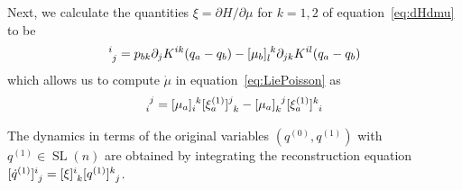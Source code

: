 \documentclass[12pt]{amsart}
\DeclareMathOperator{\SL}{SL}
\begin{document}
Next, we calculate the quantities $\xi = \partial H / \partial \mu$
for $k=1,2$ of equation~\eqref{eq:dHdmu} to be
\begin{equation*}
  [\xi_a ]\indices{^i_j} =
  p_{b k} \partial_j K^{i k}(q_a - q_b)
 -[\mu_b]\indices{_{l}^{k}} \partial_{j k} K^{i l}(q_a - q_b)
\end{equation*}
which allows us to compute $\dot{\mu}$ in equation~\eqref{eq:LiePoisson} as
\begin{equation*}
  [\dot{\mu}_a ]\indices{_i^j} =
  [\mu_a]\indices{_i^k} [\xi_a^{(1)}]\indices{^j_k}
 -[\mu_a]\indices{_k^j} [\xi_a^{(1)}]\indices{^k_i}
\end{equation*}

The dynamics in terms of the original variables $(q^{(0)},q^{(1)})$ with $q^{(1)} \in \SL(n)$ are obtained by integrating the reconstruction equation
$
  [\dot{q}^{(1)}]\indices{^i_j} =
  [\xi]\indices{^i_k} [q^{(1)}]\indices{^k_j}
$.



\end{document}
